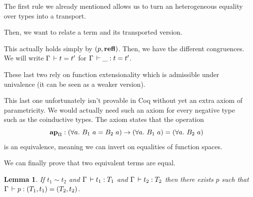 \documentclass[11pt]{article}
\theoremstyle{plain}
\newtheorem{lemma}[theorem]{Lemma}
\theoremstyle{remark}
\begin{document}
The first rule we already mentioned allows us to turn an heterogeneous equality
over types into a transport.
\begin{mathc}
\end{mathc}
Then, we want to relate a term and its transported version.
\begin{mathc}
\end{mathc}
This actually holds simply by $(p,\operatorname{\mathbf{refl}})$.
Then, we have the different congruences.
We will write $\Gamma \,\vdash t = t'$ for $\Gamma \,\vdash \_ : t = t'$.
\begin{mathc}
\end{mathc}
\begin{mathc}
\end{mathc}
These last two rely on function extensionality which is admissible under
univalence (it can be seen as a weaker version).
\begin{mathc}
\end{mathc}
This last one unfortunately isn't provable in Coq without yet an extra axiom
of parametricity. We would actually need such an axiom for every negative
type such as the coinductive types. The axiom states that the operation
\[
  \operatorname{\mathbf{ap}}_\Pi : (\forall a.\ B_1\ a = B_2\ a) \to
            (\forall a.\ B_1\ a) = (\forall a.\ B_2\ a)
\]
is an equivalence, meaning we can invert on equalities of function spaces.

We can finally prove that two equivalent terms are equal.

\begin{lemma}
  \label{lem:simeq}
  If $t_1 \sim t_2$ and $\Gamma \,\vdash t_1 : T_1$ and $\Gamma \,\vdash t_2 : T_2$
  then there exists $p$ such that $\Gamma \,\vdash p : (T_1,t_1) = (T_2,t_2)$.
\end{lemma}
\end{document}
